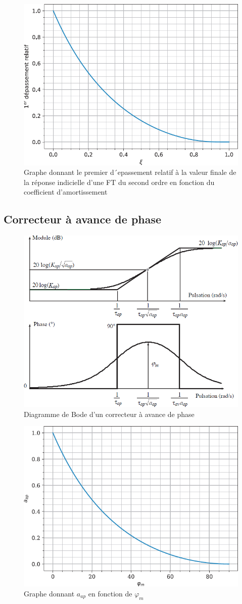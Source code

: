 \documentclass[10pt,fleqn]{article} %
\begin{document}
\begin{figure}[H]
\centering
\includegraphics[width=.6\linewidth]{fig_25}
\caption{Graphe donnant le premier d´epassement relatif à la valeur finale de la réponse
indicielle d’une FT du second ordre en fonction du coefficient d’amortissement
 \label{fig_25}}
\end{figure}

\subsection{Correcteur à avance de phase}


\begin{figure}[H]
\centering
\includegraphics[width=.6\linewidth]{fig_26}
\caption{Diagramme de Bode d’un correcteur à avance de phase  \label{fig_26}}
\end{figure}

\begin{figure}[H]
\centering
\includegraphics[width=.6\linewidth]{fig_27}
\caption{Graphe donnant $a_{ap}$ en fonction de $\varphi_m$ \label{fig_27}}
\end{figure}
\end{document}
